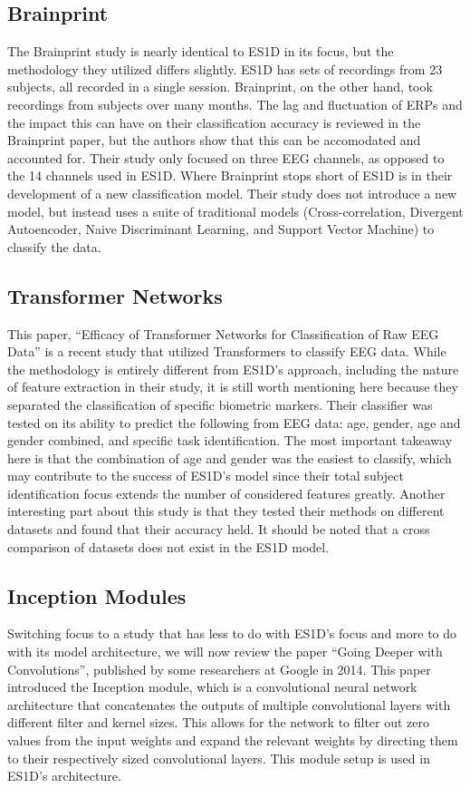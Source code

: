 \subsection{Brainprint}
The Brainprint study\cite{Brainprint} is nearly identical to ES1D in its focus, but the methodology they utilized differs slightly.
ES1D has sets of recordings from 23 subjects, all recorded in a single session. Brainprint, on the other hand, took recordings from subjects over many months.
The lag and fluctuation of ERPs and the impact this can have on their classification accuracy is reviewed in the Brainprint paper, but the authors show that this can be accomodated and accounted for.
Their study only focused on three EEG channels, as opposed to the 14 channels used in ES1D.
Where Brainprint stops short of ES1D is in their development of a new classification model.
Their study does not introduce a new model, but instead uses a suite of traditional models (Cross-correlation, Divergent Autoencoder, Naive Discriminant Learning, and Support Vector Machine) to classify the data.

\subsection{Transformer Networks}
This paper, ``Efficacy of Transformer Networks for Classification of Raw EEG Data''\cite{TransformerNetworks} is a recent study that utilized Transformers to classify EEG data.
While the methodology is entirely different from ES1D's approach, including the nature of feature extraction in their study, it is still worth mentioning here because they separated the classification of specific biometric markers.
Their classifier was tested on its ability to predict the following from EEG data: age, gender, age and gender combined, and specific task identification.
The most important takeaway here is that the combination of age and gender was the easiest to classify, which may contribute to the success of ES1D's model since their total subject identification focus extends the number of considered features greatly.
Another interesting part about this study is that they tested their methods on different datasets and found that their accuracy held.
It should be noted that a cross comparison of datasets does not exist in the ES1D model.
\subsection{Inception Modules}
Switching focus to a study that has less to do with ES1D's focus and more to do with its model architecture, we will now review the paper ``Going Deeper with Convolutions''\cite{Inception}, published by some researchers at Google in 2014.
This paper introduced the Inception module, which is a convolutional neural network architecture that concatenates the outputs of multiple convolutional layers with different filter and kernel sizes.
This allows for the network to filter out zero values from the input weights and expand the relevant weights by directing them to their respectively sized convolutional layers.
This module setup is used in ES1D's architecture.
